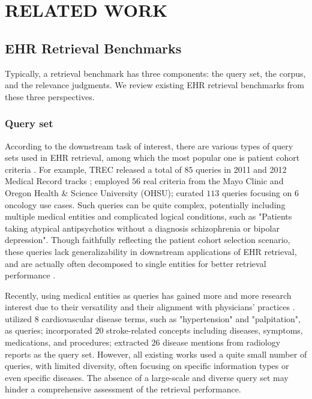 \section{RELATED WORK}
\subsection{EHR Retrieval Benchmarks}
Typically, a retrieval benchmark has three components: the query set, the corpus, and the relevance judgments.
We review existing EHR retrieval benchmarks from these three perspectives.

\subsubsection{Query set}
According to the downstream task of interest, there are various types of query sets used in EHR retrieval, among which the most popular one is patient cohort criteria \cite{trecmedicalrecord,Wang2019TestCF,Thai2024ACRAB}.
For example, TREC released a total of $85$ queries in 2011 and 2012 Medical Record tracks \cite{trecmedicalrecord}; 
\citet{Wang2019TestCF} employed $56$ real criteria from the Mayo Clinic and Oregon Health \& Science University (OHSU); 
\citet{Thai2024ACRAB} curated $113$ queries focusing on $6$ oncology use cases.
Such queries can be quite complex, potentially including multiple medical entities and complicated logical conditions, such as "Patients taking atypical antipsychotics without a diagnosis schizophrenia or bipolar depression".
Though faithfully reflecting the patient cohort selection scenario, these queries lack generalizability in downstream applications of EHR retrieval, and are actually often decomposed to single entities for better retrieval performance \cite{martinez2014improving, li2021patient, Yang2021ImprovingCE}.

Recently, using medical entities as queries has gained more and more research interest due to their versatility and their alignment with physicians' practices \cite{Yuan2020CODERKC, ruppel2020assessment, Yang2011QueryLA}.
\citet{Ping2021ResearchOS} utilized $8$ cardiovascular disease terms, such as "hypertension" and "palpitation", as queries;
\citet{Yang2021ImprovingCE} incorporated $20$ stroke-related concepts including diseases, symptoms, medications, and procedures; \citet{Shi2022ImprovingNM} extracted $26$ disease mentions from radiology reports as the query set. 
However, all existing works used a quite small number of queries, with limited diversity, often focusing on specific information types or even specific diseases. 
The absence of a large-scale and diverse query set may hinder a comprehensive assessment of the retrieval performance.

